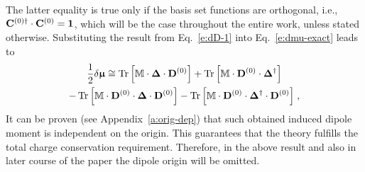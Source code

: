 \documentclass[aip,amsmath,amssymb,reprint,floatfix]{revtex4-1}
\newcommand{\BM}[1]{\bm{#1}}
\DeclareMathOperator{\Tr}{Tr}
\begin{document}
%
The latter equality is true only if the basis set functions are orthogonal, i.e., 
${\bf C}^{(0)\dagger} \cdot {\bf C}^{(0)}={\bf 1}$,
which will be the case throughout the entire work, unless stated otherwise.
Substituting the result from Eq.~\eqref{e:dD-1}
into Eq.~\eqref{e:dmu-exact} leads to
%
\begin{multline} \label{e:dmu-4-exact.linear-approximation}
 \frac{1}{2} 
 \delta {\BM{\upmu}}
  \cong
   \Tr{ 
    \left[ 
         {\mathbb{M}} \cdot {\BM\Delta} \cdot {\bf D}^{(0)}  
    \right] }
%
  +\Tr{ 
    \left[ 
         {\mathbb{M}} \cdot {\bf D}^{(0)} \cdot {\BM\Delta}^{\dagger}
    \right] } \\
%
  -\Tr{ 
    \left[ 
         {\mathbb{M}} \cdot {\bf D}^{(0)} \cdot {\BM\Delta} \cdot {\bf D}^{(0)}
    \right] }
%
  -\Tr{ 
    \left[ 
         {\mathbb{M}} \cdot {\bf D}^{(0)} \cdot {\BM\Delta}^{\dagger} \cdot {\bf D}^{(0)}
    \right] } \;,
\end{multline}
%
It can be proven (see Appendix~\ref{a:orig-dep}) that such obtained
induced dipole moment is independent on the origin. 
This guarantees that the theory fulfills the total charge conservation requirement.
Therefore,
in the above result and also in later course of the paper the dipole origin will be omitted. 
\end{document}
